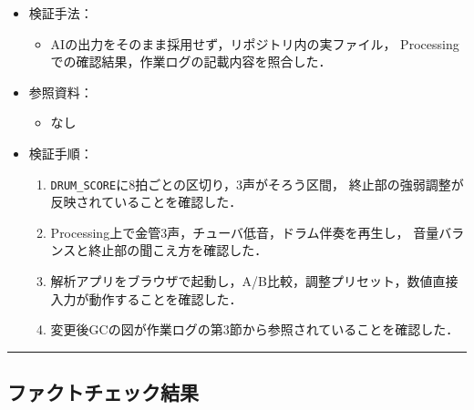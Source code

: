 \documentclass[uplatex,dvipdfmx,a4paper,11pt]{jsarticle}
\newcommand{\sectionrule}{\par\medskip\noindent\rule{\linewidth}{0.6pt}\par\medskip}
\begin{document}
\begin{itemize}
  \item 検証手法：
    \begin{itemize}
      \item {}AIの出力をそのまま採用せず，リポジトリ内の実ファイル，
        Processingでの確認結果，作業ログの記載内容を照合した．
    \end{itemize}
  \item 参照資料：
    \begin{itemize}
      \item なし
    \end{itemize}
  \item 検証手順：
    \begin{enumerate}
      \item {}\texttt{DRUM\_SCORE}に8拍ごとの区切り，3声がそろう区間，
        終止部の強弱調整が反映されていることを確認した．
      \item {}Processing上で金管3声，チューバ低音，ドラム伴奏を再生し，
        音量バランスと終止部の聞こえ方を確認した．
      \item {}解析アプリをブラウザで起動し，A/B比較，調整プリセット，数値直接入力が動作することを確認した．
      \item {}変更後GCの図が作業ログの第3節から参照されていることを確認した．
    \end{enumerate}
\end{itemize}

\sectionrule

\subsection{ファクトチェック結果}
\end{document}
